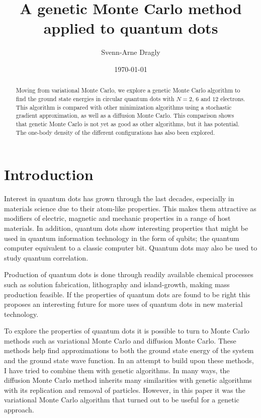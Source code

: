 \documentclass[aps,prb,twocolumn,floatfix]{revtex4}
\begin{document}
\title{A genetic Monte Carlo method applied to quantum dots}
\author{Svenn-Arne Dragly}
\date{\today}
\begin{abstract}
Moving from variational Monte Carlo, we explore a genetic Monte Carlo algorithm to find the ground state energies in circular quantum dots with $N = 2$, $6$ and $12$ electrons. This algorithm is compared with other minimization algorithms using a stochastic gradient approximation, as well as a diffusion Monte Carlo. This comparison shows that genetic Monte Carlo is not yet as good as other algorithms, but it has potential. The one-body density of the different configurations has also been explored.
\end{abstract}


\maketitle

\section{Introduction} \label{sec:introduction}
Interest in quantum dots has grown through the last decades, especially in materials science due to their atom-like properties.
This makes them attractive as modifiers of electric, magnetic and mechanic properties in a range of host materials.
In addition, quantum dots show interesting properties that might be used in quantum information technology in the form of qubits; the quantum computer equivalent to a classic computer bit. Quantum dots may also be used to study quantum correlation.

Production of quantum dots is done through readily available chemical processes such as solution fabrication, lithography and island-growth, making mass production feasible.\cite{nanosolids} If the properties of quantum dots are found to be right this proposes an interesting future for more uses of quantum dots in new material technology.

To explore the properties of quantum dots it is possible to turn to Monte Carlo methods such as variational Monte Carlo and diffusion Monte Carlo. These methods help find approximations to both the ground state energy of the system and the ground state wave function. In an attempt to build upon these methods, I have tried to combine them with genetic algorithms. In many ways, the diffusion Monte Carlo method inherits many similarities with genetic algorithms with its replication and removal of particles. However, in this paper it was the variational Monte Carlo algorithm that turned out to be useful for a genetic approach.
\end{document}
